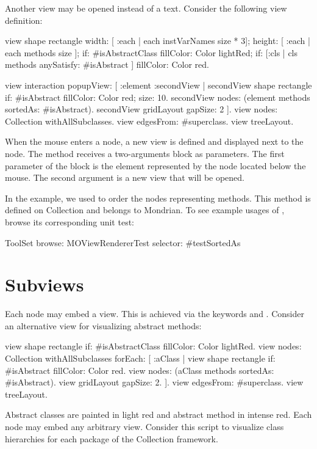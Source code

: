 \documentclass[a4paper,10pt,twoside]{book}
\begin{document}
Another view may be opened instead of a text. Consider the following view definition:

\begin{code}{}
view shape rectangle
  width: [ :each | each instVarNames size * 3];
  height: [ :each | each methods size ];
  if: #isAbstractClass fillColor: Color lightRed;
  if: [:cls | cls methods anySatisfy: #isAbstract ] fillColor: Color red.
  
view interaction popupView: [ :element :secondView | 
  secondView shape rectangle 
    if: #isAbstract fillColor: Color red;
    size: 10.  
  secondView nodes: (element methods sortedAs: #isAbstract).
  secondView gridLayout gapSize: 2
  ].
view nodes: Collection withAllSubclasses.
view edgesFrom: #superclass.
view treeLayout.
\end{code}

When the mouse enters a node, a new view is defined and displayed next to the node. The method  receives a two-arguments block as parameters. The first parameter of the block is the element represented by the node located below the mouse. The second argument is a new view that will be opened.

In the example, we used  to order the nodes representing methods. This method is defined on Collection and belongs to Mondrian. To see example usages of , browse its corresponding unit test:
\begin{code}{}
ToolSet browse: MOViewRendererTest selector: #testSortedAs 
\end{code}

\section{Subviews}
Each node may embed a view. This is achieved via the keywords  and . Consider an alternative view for visualizing abstract methods:

\begin{code}{}
view shape rectangle
  if: #isAbstractClass fillColor: Color lightRed.
view nodes: Collection withAllSubclasses forEach: [ :aClass | 
  view shape rectangle 
    if: #isAbstract fillColor: Color red.
  view nodes: (aClass methods sortedAs: #isAbstract).
  view gridLayout gapSize: 2. 
].
view edgesFrom: #superclass.
view treeLayout.
\end{code}

Abstract classes are painted in light red and abstract method in intense red. 
Each node may embed any arbitrary view. Consider this script to visualize class hierarchies for each package of the Collection framework.
\end{document}
